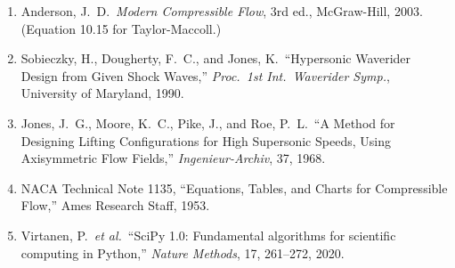 \documentclass[12pt,a4paper]{article}
\begin{document}
\begin{enumerate}
    \item Anderson, J.~D.\ \textit{Modern Compressible Flow}, 3rd ed.,
          McGraw-Hill, 2003. (Equation 10.15 for Taylor-Maccoll.)
    \item Sobieczky, H., Dougherty, F.~C., and Jones, K.\ ``Hypersonic
          Waverider Design from Given Shock Waves,''
          \textit{Proc.\ 1st Int.\ Waverider Symp.}, University of Maryland,
          1990.
    \item Jones, J.~G., Moore, K.~C., Pike, J., and Roe, P.~L.\ ``A Method
          for Designing Lifting Configurations for High Supersonic Speeds,
          Using Axisymmetric Flow Fields,'' \textit{Ingenieur-Archiv}, 37,
          1968.
    \item NACA Technical Note 1135, ``Equations, Tables, and Charts for
          Compressible Flow,'' Ames Research Staff, 1953.
    \item Virtanen, P.\ \textit{et al.}\ ``SciPy 1.0: Fundamental algorithms
          for scientific computing in Python,'' \textit{Nature Methods},
          17, 261--272, 2020.
\end{enumerate}
\end{document}
